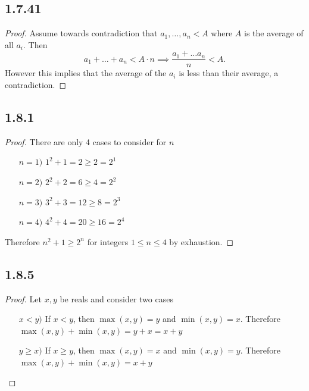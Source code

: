 \documentclass[12pt,titlepage]{extarticle}
\begin{document}
\subsection*{1.7.41}
\begin{proof}
    Assume towards contradiction that $a_1, \ldots, a_n < A$ where $A$ is the average of all $a_i$. Then
    \[
        a_1 + \ldots + a_n < A\cdot n \implies \frac{a_1 + \ldots a_{n}}{n} < A
    .\]
    However this implies that the average of the $a_i$ is less than their average, a contradiction.
\end{proof}

\subsection*{1.8.1}
\begin{proof}
    There are only 4 cases to consider for $n$
    \begin{enumerate}[leftmargin=2cm]
        \item[$n=1)$] $1^2 + 1 = 2 \geq 2 = 2^1$
        \item[$n=2)$] $2^2 + 2 = 6 \geq 4 = 2^2$
        \item[$n=3)$] $3^2 + 3 = 12 \geq 8 = 2^3$
        \item[$n=4)$] $4^2 + 4 = 20 \geq 16 = 2^4$
    \end{enumerate}
    Therefore $n^2 + 1 \geq 2^n$ for integers $1 \leq n \leq 4$ by exhaustion.
\end{proof}

\subsection*{1.8.5}
\begin{proof}
    Let $x,y$ be reals and consider two cases
    \begin{enumerate}[leftmargin=2cm]
        \item[$x < y)$] If $x < y$, then $\max(x,y) = y$ and $\min(x,y) = x$. Therefore $\max(x,y) + \min(x,y) = y + x = x + y$
        \item[$y \geq x)$] If $x \geq y$, then $\max(x,y) = x$ and $\min(x,y) = y$. Therefore $\max(x,y) + \min(x,y) = x + y$ \qedhere
    \end{enumerate}
\end{proof}
\end{document}
